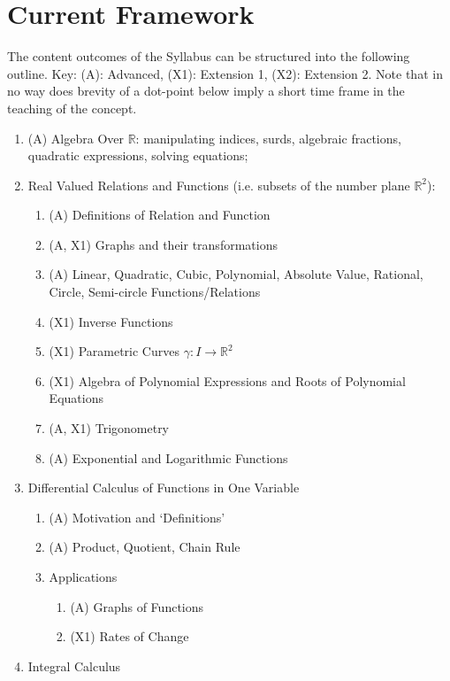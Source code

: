 \documentclass[11pt, a4paper, oneside]{article}
\begin{document}
\section{Current Framework}
The content outcomes of the Syllabus can be structured into the following outline. Key: (A): Advanced, (X1): Extension 1, (X2): Extension 2. Note that in no way does brevity of a dot-point below imply a short time frame in the teaching of the concept.
\begin{enumerate}
  \item (A) Algebra Over $\mathbb{R}$: manipulating indices, surds, algebraic fractions, quadratic expressions, solving equations;
  \item Real Valued Relations and Functions (i.e. subsets of the number plane $\mathbb{R}^2$):
    \begin{enumerate}
      \item (A) Definitions of Relation and Function
      \item (A, X1) Graphs and their transformations
      \item (A) Linear, Quadratic, Cubic, Polynomial, Absolute Value, Rational, Circle, Semi-circle Functions/Relations
      \item (X1) Inverse Functions
      \item (X1) Parametric Curves $\gamma: I \rightarrow \mathbb{R}^2$
      \item (X1) Algebra of Polynomial Expressions and Roots of Polynomial Equations
      \item (A, X1) Trigonometry
      \item (A) Exponential and Logarithmic Functions
    \end{enumerate}
  \item Differential Calculus of Functions in One Variable
    \begin{enumerate}
      \item (A) Motivation and `Definitions'
      \item (A) Product, Quotient, Chain Rule
      \item Applications
        \begin{enumerate}
          \item (A) Graphs of Functions
          \item (X1) Rates of Change
        \end{enumerate}
    \end{enumerate}
  \item Integral Calculus
    \begin{enumerate}

\end{enumerate}
\end{enumerate}
\end{document}
